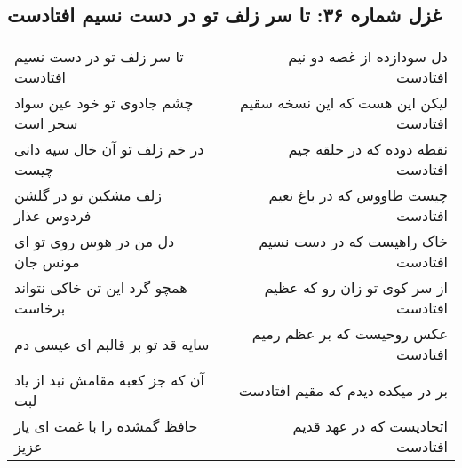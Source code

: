 \begin{center}
\section*{غزل شماره ۳۶: تا سر زلف تو در دست نسیم افتادست}
\label{sec:sh036}
\begin{longtable}{l p{0.5cm} r}
تا سر زلف تو در دست نسیم افتادست
&&
دل سودازده از غصه دو نیم افتادست
\\
چشم جادوی تو خود عین سواد سحر است
&&
لیکن این هست که این نسخه سقیم افتادست
\\
در خم زلف تو آن خال سیه دانی چیست
&&
نقطه دوده که در حلقه جیم افتادست
\\
زلف مشکین تو در گلشن فردوس عذار
&&
چیست طاووس که در باغ نعیم افتادست
\\
دل من در هوس روی تو ای مونس جان
&&
خاک راهیست که در دست نسیم افتادست
\\
همچو گرد این تن خاکی نتواند برخاست
&&
از سر کوی تو زان رو که عظیم افتادست
\\
سایه قد تو بر قالبم ای عیسی دم
&&
عکس روحیست که بر عظم رمیم افتادست
\\
آن که جز کعبه مقامش نبد از یاد لبت
&&
بر در میکده دیدم که مقیم افتادست
\\
حافظ گمشده را با غمت ای یار عزیز
&&
اتحادیست که در عهد قدیم افتادست
\\
\end{longtable}
\end{center}
